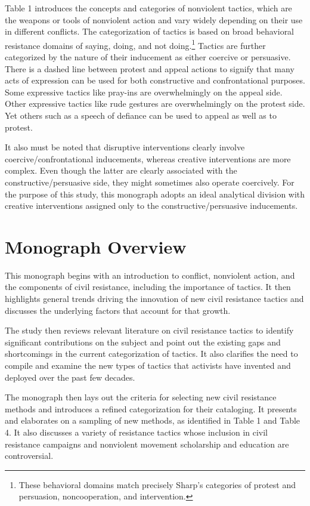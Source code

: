 \documentclass[twoside,a4paper,12pt,fleqn,openany]{extbook}
\begin{document}
Table 1 introduces the concepts and categories of nonviolent tactics, which are the weapons or tools of nonviolent action and vary widely depending on their use in different conflicts. The categorization of tactics is based on broad behavioral resistance domains of saying, doing, and not doing.\footnote{These behavioral domains match precisely Sharp’s categories of protest and persuasion, noncooperation, and intervention.} Tactics are further categorized by the nature of their inducement as either coercive or persuasive. There is a dashed line between protest and appeal actions to signify that many acts of expression can be used for both constructive and confrontational purposes. Some expressive tactics like pray-ins are overwhelmingly on the appeal side. Other expressive tactics like rude gestures are overwhelmingly on the protest side. Yet others such as a speech of defiance can be used to appeal as well as to protest.

It also must be noted that disruptive interventions clearly involve coercive/confrontational inducements, whereas creative interventions are more complex. Even though the latter are clearly associated with the constructive/persuasive side, they might sometimes also operate coercively. For the purpose of this study, this monograph adopts an ideal analytical division with creative interventions assigned only to the constructive/persuasive inducements.

\section*{Monograph Overview}

This monograph begins with an introduction to conflict, nonviolent action, and the components of civil resistance, including the importance of tactics. It then highlights general trends driving the innovation of new civil resistance tactics and discusses the underlying factors that account for that growth.

The study then reviews relevant literature on civil resistance tactics to identify significant contributions on the subject and point out the existing gaps and shortcomings in the current categorization of tactics. It also clarifies the need to compile and examine the new types of tactics that activists have invented and deployed over the past few decades.

The monograph then lays out the criteria for selecting new civil resistance methods and introduces a refined categorization for their cataloging. It presents and elaborates on a sampling of new methods, as identified in Table 1 and Table 4. It also discusses a variety of resistance tactics whose inclusion in civil resistance campaigns and nonviolent movement scholarship and education are controversial.
\end{document}
